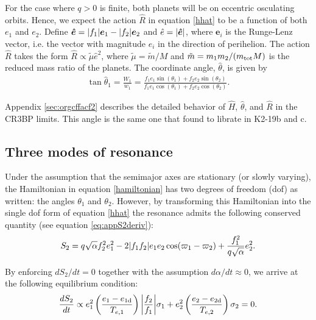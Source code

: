 \documentclass[usenatbib,twocolumn]{mnras}
\renewcommand{\v}[1]{\boldsymbol{ #1 }}
\DeclarePairedDelimiter{\abs}{|}{|}
\begin{document}
For the case where \(q>0\) is finite, both planets will be on eccentric
osculating orbits.  Hence, we expect the action \(\hat R\) in equation
\eqref{hhat} to be a function of both \(e_1\) and \(e_2\).  Define \(\v{\hat
e} = \abs{f_1}\v e_1 - \abs{f_2}\v e_2\) and \(\hat e = \abs{\v{\hat
e}}\), where \(\v e_i\) is the Runge-Lenz vector, i.e. the vector with
magnitude \(e_i\) in the direction of perihelion.  The action \(\hat R\)
takes the form \(\hat R \propto \tilde \mu \hat e^2\), where
\(\tilde\mu=\tilde m/M\) and \(\tilde m= m_1m_2/(m_{\rm tot}M)\) is the
reduced mass ratio of the planets.  The coordinate angle, \(\hat\theta\),
is given by
\begin{align}
\label{hattheta}
  \tan\hat{\theta}_1 = \frac{W_1}{w_1} = \frac{f_1 e_1\sin(\theta_1)
  + f_2e_2\sin(\theta_2)}{f_1e_1\cos(\theta_1) + f_2e_2\cos(\theta_2)}.
\end{align}

\noindent
Appendix \ref{sec:orgcffacf2}
describes the detailed behavior of \(\hat H\), \(\hat \theta\),
and \(\hat R\) in the CR3BP limits.
This angle is the same one that \citet{petit_resonance_2020}
found to librate in K2-19b and c.

\subsection{Three modes of resonance}
\label{sec:orgb5d689f}
Under the assumption that the semimajor axes are stationary (or slowly
varying), the Hamiltonian in equation \eqref{hamiltonian} has two
degrees of freedom (dof) as written: the angles \(\theta_1\) and
\(\theta_2\).  However, by transforming this Hamiltonian into the single
dof form of equation \eqref{hhat} the resonance admits the following
conserved quantity (see equation \eqref{eq:appS2deriv}):
\begin{align}
  \label{eq:s2}
  S_2 = q\sqrt{\alpha}f_2^2e_1^2
-2\abs{f_1f_2}e_1e_2\cos(\varpi_1-\varpi_2) + \frac{f_1^2}{q\sqrt\alpha}e_2^2.
\end{align}

\noindent
By enforcing \(dS_2/dt = 0\) together with the assumption \(d\alpha/dt
\approx 0\), we arrive at the following equilibrium condition:
\begin{align}
  \label{eq:S2eq}
  \frac{dS_2}{dt} \propto e_1^2\left(\frac{e_1-e_{1\rm d}}{T_{e,1}}\right)\abs*{\frac{f_2}{f_1}}
  \sigma_1
  + e_2^2\left(\frac{e_2-e_{2\rm d}}{T_{e,2}}\right)
  \sigma_2
  = 0.
\end{align}
\end{document}
